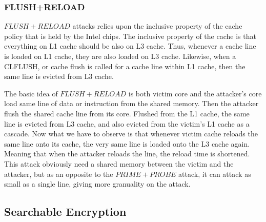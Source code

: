\documentclass[a4paper]{article}
\begin{document}
\subsubsection{FLUSH+RELOAD}

$FLUSH+RELOAD$ attacks relies upon the inclusive property of the cache policy that is held by the Intel chips. The inclusive property of the cache is that everything on L1 cache should be also on L3 cache. Thus, whenever a cache line is loaded on L1 cache, they are also loaded on L3 cache. Likewise, when a CLFLUSH, or cache flush is called for a cache line within L1 cache, then the same line is evicted from L3 cache.\par
The basic idea of $FLUSH+RELOAD$ is both victim core and the attacker's core load same line of data or instruction from the shared memory. Then the attacker flush the shared cache line from its core. Flushed from the L1 cache, the same line is evicted from L3 cache, and also evicted from the victim's L1 cache as a cascade. Now what we have to observe is that whenever victim cache reloads the same line onto its cache, the very same line is loaded onto the L3 cache again. Meaning that when the attacker reloads the line, the reload time is shortened. This attack obviously need a shared memory between the victim and the attacker, but as an opposite to the $PRIME+PROBE$ attack, it can attack as small as a single line, giving more granuality on the attack.

\subsection{Searchable Encryption}
\end{document}
